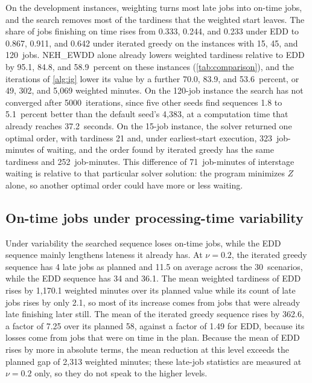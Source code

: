 \sumpara On the development instances, weighting turns most late jobs into on-time jobs, and the search removes most of the tardiness that the weighted start leaves. \sumparaend
\fin The share of jobs finishing on time rises from 0.333, 0.244, and 0.233 under EDD to 0.867, 0.911, and 0.642 under iterated greedy on the instances with 15, 45, and 120~jobs. \fine
\fin NEH\_EWDD alone already lowers weighted tardiness relative to EDD by 95.1, 84.8, and 58.9~percent on these instances (\cref{tab:comparison}), and the iterations of \cref{alg:ig} lower its value by a further 70.0, 83.9, and 53.6~percent, or 49, 302, and 5,069 weighted minutes. \fine
\fin On the 120-job instance the search has not converged after 5000~iterations, since five other seeds find sequences 1.8 to 5.1~percent better than the default seed's 4,383, at a computation time that already reaches 37.2~seconds. \fine
\fin On the 15-job instance, the solver returned one optimal order, with tardiness 21 and, under earliest-start execution, 323~job-minutes of waiting, and the order found by iterated greedy has the same tardiness and 252~job-minutes. \fine
\fin This difference of 71~job-minutes of interstage waiting is relative to that particular solver solution: the program minimizes $Z$ alone, so another optimal order could have more or less waiting. \fine

\subsection{On-time jobs under processing-time variability}\label{sec:loss}

\sumpara Under variability the searched sequence loses on-time jobs, while the EDD sequence mainly lengthens lateness it already has. \sumparaend
\fin At $\nu = 0.2$, the iterated greedy sequence has 4 late jobs as planned and 11.5 on average across the 30~scenarios, while the EDD sequence has 34 and 36.1. \fine
\fin The mean weighted tardiness of EDD rises by 1,170.1 weighted minutes over its planned value while its count of late jobs rises by only 2.1, so most of its increase comes from jobs that were already late finishing later still. \fine
\fin The mean of the iterated greedy sequence rises by 362.6, a factor of 7.25 over its planned 58, against a factor of 1.49 for EDD, because its losses come from jobs that were on time in the plan. \fine
\fin Because the mean of EDD rises by more in absolute terms, the mean reduction at this level exceeds the planned gap of 2,313 weighted minutes; these late-job statistics are measured at $\nu = 0.2$ only, so they do not speak to the higher levels. \fine

